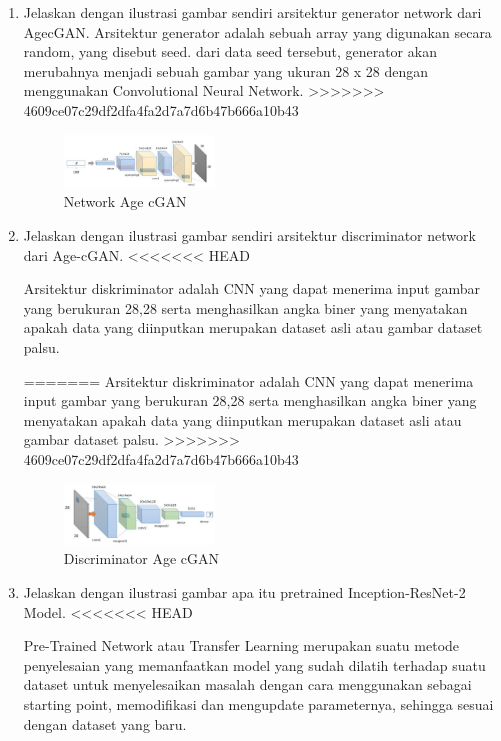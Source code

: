 \begin{enumerate}
        \item Jelaskan dengan ilustrasi gambar sendiri arsitektur generator network dari AgecGAN.
		Arsitektur generator adalah sebuah array yang digunakan secara random, yang disebut seed. dari data seed tersebut, generator akan merubahnya menjadi sebuah gambar yang ukuran 28 x 28 dengan menggunakan Convolutional Neural Network.
>>>>>>> 4609ce07c29df2dfa4fa2d7a7d6b47b666a10b43
		\begin{figure}[H]
			\includegraphics[width=4cm]{figures/1174039/chapter9/teori4.PNG}
            	\centering
           	\caption{Network Age cGAN}
       	\end{figure}


        \item Jelaskan dengan ilustrasi gambar sendiri arsitektur discriminator network dari Age-cGAN.
<<<<<<< HEAD

		Arsitektur diskriminator adalah CNN yang dapat menerima input gambar yang berukuran 28,28 serta menghasilkan angka biner yang menyatakan apakah data yang diinputkan merupakan dataset asli atau gambar dataset palsu.

=======
		Arsitektur diskriminator adalah CNN yang dapat menerima input gambar yang berukuran 28,28 serta menghasilkan angka biner yang menyatakan apakah data yang diinputkan merupakan dataset asli atau gambar dataset palsu.
>>>>>>> 4609ce07c29df2dfa4fa2d7a7d6b47b666a10b43
		\begin{figure}[H]
			\includegraphics[width=4cm]{figures/1174039/chapter9/teori5.PNG}
            	\centering
           	\caption{Discriminator Age cGAN}
       	\end{figure}


        \item Jelaskan dengan ilustrasi gambar apa itu pretrained Inception-ResNet-2 Model.
<<<<<<< HEAD

		Pre-Trained Network atau Transfer Learning merupakan suatu metode penyelesaian yang memanfaatkan model yang sudah dilatih terhadap suatu dataset untuk menyelesaikan masalah dengan cara menggunakan sebagai starting point, memodifikasi dan mengupdate parameternya, sehingga sesuai dengan dataset yang baru.


\end{enumerate}
